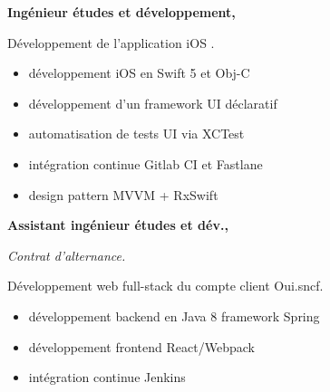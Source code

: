\documentclass{cv}
\begin{document}
\noindent\begin{minipage}[t]{.65\textwidth}


\newlength{\logoboxwidth}
\setlength{\logoboxwidth}{20mm}

\begin{mainexpbox}[title=nov. 2019 -- aujourd'hui]

	\begin{minipage}[t]{\logoboxwidth}%
	\centering
	\end{minipage}
	\begin{minipage}[t]{0.8\textwidth}
	\textbf{Ingénieur études et développement, \evtech{}}

	Développement de l'application iOS \href{https://apps.apple.com/fr/app/oui-sncf-train-et-bus/id343889987}{}.

	\begin{itemize}
	\item développement iOS en Swift 5 et Obj-C
	\item développement d'un framework UI déclaratif
	\item automatisation de tests UI via XCTest
	\item intégration continue Gitlab CI et Fastlane
	\item design pattern MVVM + RxSwift
	\end{itemize}
	\end{minipage}

\end{mainexpbox}

\begin{expbox}[title={déc. 2016, \faicon{clock-o} 3 ans}]

	\begin{minipage}[t]{\logoboxwidth}
	\centering
	\end{minipage}
	\begin{minipage}[t]{0.8\textwidth}
	\textbf{Assistant ingénieur études et dév., \evtech{}}

	\textit{Contrat d'alternance.} 
	
	Développement web full-stack du compte client Oui.sncf.

	\begin{itemize}
	\item développement backend en Java 8 framework Spring
	\item développement frontend React/Webpack
	\item intégration continue Jenkins
	\end{itemize}
	\end{minipage}


\end{expbox}
\end{minipage}
\end{document}
